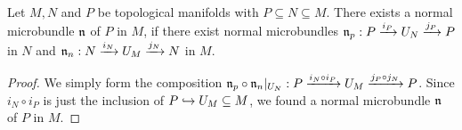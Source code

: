  \\
Let $M, N$ and $P$ be topological manifolds with $P \subseteq N \subseteq M$.
There exists a normal microbundle $\bn$ of $P$ in $M$, if
there exist normal microbundles $\bn_p: \bundle{P}{U_N}{i_P}{j_P}$ in $N$ and $\bn_n: \bundle{N}{U_M}{i_N}{j_N}$ in $M$.
\begin{proof}
We simply form the composition $\bn_p \circ \bn_n\restrict{U_N}: \bundle{P}{U_M}{i_N \circ i_P}{j_P \circ j_N}$.
Since $i_N \circ i_P$ is just the inclusion of $P \incl U_M \subseteq M$, we found a normal microbundle $\bn$ of $P$ in $M$.
\end{proof}